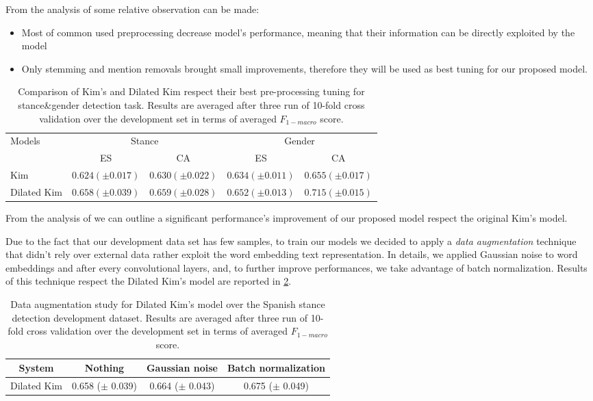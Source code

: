 From the analysis of  some relative observation can be made:
\begin{itemize}
\item Most of common used preprocessing decrease model's performance, meaning that their information can be directly exploited by the model
\item Only stemming and mention removals brought small improvements, therefore they will be used as best tuning for our proposed model.
\end{itemize}



\begin{table}[t]
\footnotesize
\caption{Comparison of Kim's and Dilated Kim respect their best pre-processing tuning for stance\&gender detection task. Results are averaged after three run of 10-fold cross validation over the development set in terms of averaged $F_{1-macro}$ score.}
\label{tab:dilation}
\centering
\begin{tabular}{l|cc|cc}
\toprule
\hline
\multirow{2}{*}{Models}		& \multicolumn{2}{c}{Stance}	& \multicolumn{2}{c}{Gender}\\
\cline{2-5}
							& ES		& CA		& ES		& CA		\\
\hline
Kim							& $0.624 (\pm0.017)$ & $0.630 (\pm0.022)$ & $0.634 (\pm0.011)$ & $0.655 (\pm0.017)$	\\
Dilated Kim					& $0.658 (\pm0.039)$ & $0.659 (\pm0.028)$ & $0.652 (\pm0.013)$ & $0.715 (\pm0.015)$	\\
\hline
\bottomrule
\end{tabular}
\end{table}

From the analysis of  we can outline a significant performance's improvement of our proposed model respect the original Kim's model.


Due to the fact that our development data set has few samples, to train our models we decided to apply a \emph{data augmentation} technique that didn't rely over external data rather exploit the word embedding text representation. In details, we applied Gaussian noise to word embeddings and after every convolutional layers, and, to further improve performances, we take advantage of batch normalization.
Results of this technique respect the Dilated Kim's model are reported in \cref{tab:augmentation}.

\begin{table}[h]
\footnotesize
\caption{Data augmentation study for Dilated Kim's model over the Spanish stance detection development dataset. Results are averaged after three run of 10-fold cross validation over the development set in terms of averaged $F_{1-macro}$ score. }
\label{tab:augmentation}
\centering
\begin{tabular}{c|ccc}
\toprule
\hline
System		& Nothing	& Gaussian noise	& Batch normalization	\\
\hline
Dilated Kim	& 0.658 ($\pm$ 0.039) & 0.664 ($\pm$ 0.043)	& 0.675 ($\pm$ 0.049)	\\
\hline
\bottomrule
\end{tabular}
\end{table}


